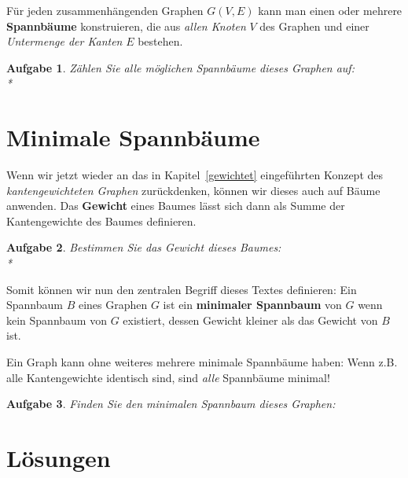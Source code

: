 \documentclass[12pt,a4paper]{report}
\theoremstyle{break}
\newtheorem{exercise}{Aufgabe}[section]
\theoremstyle{plain}
\begin{document}
F\"ur jeden zusammenh\"{a}ngenden Graphen $G(V,E)$ kann man einen oder mehrere
\textbf{Spannb\"{a}ume} konstruieren, die aus \emph{allen Knoten} $V$ des
Graphen und einer \emph{Untermenge der Kanten} $E$ bestehen.

\begin{exercise}\label{exspan}
Z\"{a}hlen Sie alle m\"{o}glichen Spannb\"{a}ume dieses Graphen auf:\\*
\end{exercise}

\section{Minimale Spannb\"{a}ume}

Wenn wir jetzt wieder an das in Kapitel~\ref{gewichtet}
eingef\"{u}hrten Konzept des \emph{kantengewichteten Graphen}
zur\"{u}ckdenken, k\"{o}nnen wir dieses auch auf B\"{a}ume
anwenden. Das \textbf{Gewicht} eines Baumes l\"{a}sst sich dann als
Summe der Kantengewichte des Baumes definieren.

\begin{exercise}\label{exgewicht}
Bestimmen Sie das Gewicht dieses Baumes:\\*
\end{exercise}

Somit k\"{o}nnen wir nun den zentralen Begriff dieses Textes
definieren: Ein Spannbaum $B$ eines Graphen $G$ ist ein
\textbf{minimaler Spannbaum} von $G$ wenn kein Spannbaum von $G$
existiert, dessen Gewicht kleiner als das Gewicht von $B$ ist.

Ein Graph kann ohne weiteres mehrere minimale Spannb\"{a}ume haben:
Wenn z.B. alle Kantengewichte identisch sind, sind \emph{alle}
Spannb\"{a}ume minimal!


\begin{exercise}\label{exspangewicht}
Finden Sie den minimalen Spannbaum dieses Graphen:

\end{exercise}

\section{L\"{o}sungen}
\end{document}
